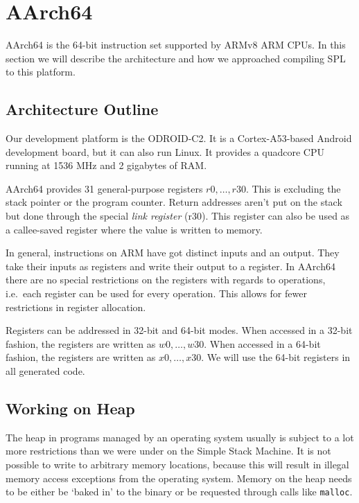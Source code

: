 \chapter{AArch64}

AArch64 is the 64-bit instruction set supported by ARMv8 ARM CPUs.
In this section we will describe the architecture and how we approached compiling SPL to this platform.

\section{Architecture Outline}

Our development platform is the ODROID-C2.
It is a Cortex-A53-based Android development board, but it can also run Linux.
It provides a quadcore CPU running at 1536 MHz and 2 gigabytes of RAM\@.

AArch64 provides 31 general-purpose registers $r0, \ldots, r30$.
This is excluding the stack pointer or the program counter.
Return addresses aren't put on the stack but done through the special \emph{link register} (r30).
This register can also be used as a callee-saved register where the value is written to memory.

In general, instructions on ARM have got distinct inputs and an output.
They take their inputs as registers and write their output to a register.
In AArch64 there are no special restrictions on the registers with regards to operations, i.e.\ each register can be used for every operation.
This allows for fewer restrictions in register allocation.

Registers can be addressed in 32-bit and 64-bit modes.
When accessed in a 32-bit fashion, the registers are written as $w0, \ldots, w30$.
When accessed in a 64-bit fashion, the registers are written as $x0, \ldots, x30$.
We will use the 64-bit registers in all generated code.

\section{Working on Heap}

The heap in programs managed by an operating system usually is subject to a lot more restrictions than we were under on the Simple Stack Machine.
It is not possible to write to arbitrary memory locations, because this will result in illegal memory access exceptions from the operating system.
Memory on the heap needs to be either be `baked in' to the binary or be requested through calls like \texttt{malloc}.

